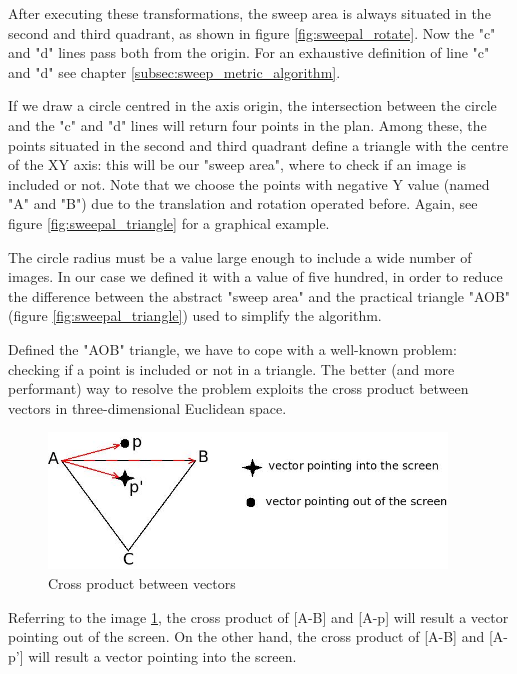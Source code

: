 %
After executing these transformations, the sweep area is always situated in the second and third quadrant, as
shown in figure \ref{fig:sweepal_rotate}. Now the "c" and "d" lines pass both from the origin. For an exhaustive
definition of line "c" and "d" see chapter \ref{subsec:sweep_metric_algorithm}.
%

%
If we draw a circle centred in the axis origin, the intersection between the circle and the "c" and "d" lines will
return four points in the plan. Among these, the points situated in the second and third quadrant define a triangle
with the centre of the XY axis: this will be our "sweep area", where to check if an image is included or not. Note
that we choose the points with negative Y value (named "A" and "B") due to the translation and rotation operated
before. Again, see figure \ref{fig:sweepal_triangle} for a graphical example.
%

%
The circle radius must be a value large enough to include a wide number of images. In our case we defined it with a
value of five hundred, in order to reduce the difference between the abstract "sweep area" and the practical triangle
"AOB" (figure \ref{fig:sweepal_triangle}) used to simplify the algorithm.
%

%
Defined the "AOB" triangle, we have to cope with a well-known problem: checking if a point is included or not in a
triangle. The better (and more performant) way to resolve the problem exploits the cross product between vectors
in three-dimensional Euclidean space.
%

%
\begin{figure}[!h]
  \begin{center}
    \includegraphics[width=300pt]{img/sweepal_crossproductABC.jpeg} 
    \caption{Cross product between vectors}
    \label{fig:sweepal_crossproductABC}
  \end{center}
\end{figure}
%

Referring to the image \ref{fig:sweepal_crossproductABC}, the cross product of [A-B] and [A-p] will result a vector
pointing out of the screen. On the other hand, the cross product of [A-B] and [A-p'] will result a vector pointing
into the screen.
%

